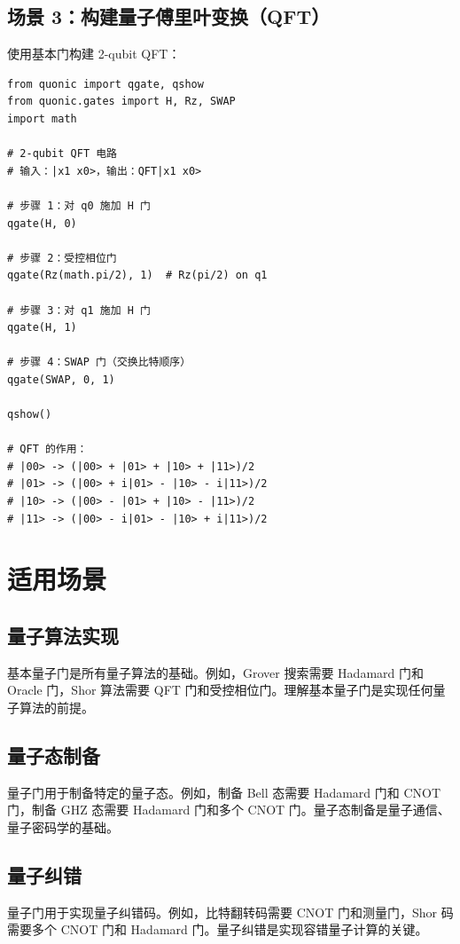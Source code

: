 \documentclass[12pt,a4paper]{article}
\begin{document}
\subsection{场景 3：构建量子傅里叶变换（QFT）}

使用基本门构建 2-qubit QFT：

\begin{verbatim}
from quonic import qgate, qshow
from quonic.gates import H, Rz, SWAP
import math

# 2-qubit QFT 电路
# 输入：|x1 x0>，输出：QFT|x1 x0>

# 步骤 1：对 q0 施加 H 门
qgate(H, 0)

# 步骤 2：受控相位门
qgate(Rz(math.pi/2), 1)  # Rz(pi/2) on q1

# 步骤 3：对 q1 施加 H 门
qgate(H, 1)

# 步骤 4：SWAP 门（交换比特顺序）
qgate(SWAP, 0, 1)

qshow()

# QFT 的作用：
# |00> -> (|00> + |01> + |10> + |11>)/2
# |01> -> (|00> + i|01> - |10> - i|11>)/2
# |10> -> (|00> - |01> + |10> - |11>)/2
# |11> -> (|00> - i|01> - |10> + i|11>)/2
\end{verbatim}

\section{适用场景}

\subsection{量子算法实现}

基本量子门是所有量子算法的基础。例如，Grover 搜索需要 Hadamard 门和 Oracle 门，Shor 算法需要 QFT 门和受控相位门。理解基本量子门是实现任何量子算法的前提。

\subsection{量子态制备}

量子门用于制备特定的量子态。例如，制备 Bell 态需要 Hadamard 门和 CNOT 门，制备 GHZ 态需要 Hadamard 门和多个 CNOT 门。量子态制备是量子通信、量子密码学的基础。

\subsection{量子纠错}

量子门用于实现量子纠错码。例如，比特翻转码需要 CNOT 门和测量门，Shor 码需要多个 CNOT 门和 Hadamard 门。量子纠错是实现容错量子计算的关键。
\end{document}
